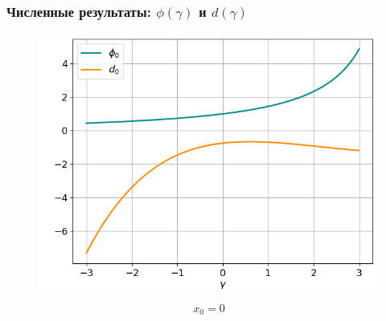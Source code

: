 \documentclass[fullscreen=true, unicode, bookmarks=false]{beamer}
\begin{document}
\begin{frame}
\frametitle{ Численные результаты: $ \phi(\gamma) $ и $ d(\gamma) $ }

\begin{figure} 
\includegraphics[scale=0.53]{divergent_phi0d0_0.png}  
\end{figure}

$$ x_0 = 0 $$

\end{frame}
\end{document}
